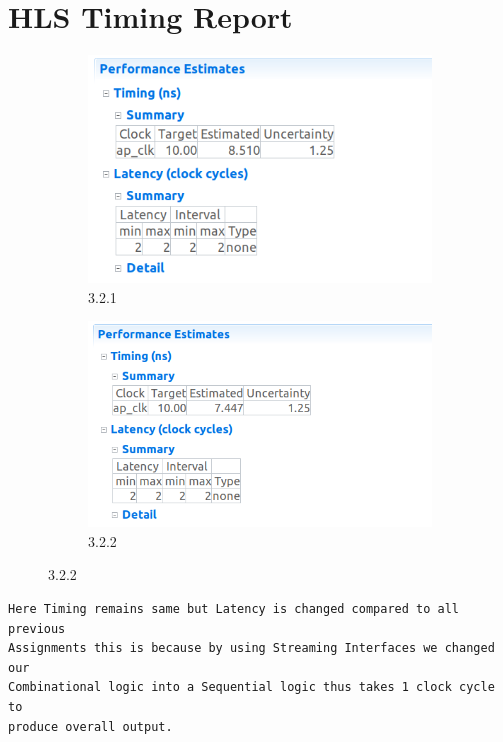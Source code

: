 \documentclass{article}
\begin{document}
\section{HLS Timing Report}
\vspace{1cm}
\begin{figure}[h]
\centering
\begin{subfigure}[b]{0.8\textwidth}
    \centering
\includegraphics[width=\textwidth]{figs/32a.png}
    \caption{3.2.1}
    \label{fig:my_label}
\end{subfigure}
\hfill
\begin{subfigure}[b]{0.8\textwidth}
    \centering
\includegraphics[width=\textwidth]{figs/32b.png}
    \caption{3.2.2}
    \label{fig:my_label}
\end{subfigure}
\end{figure}
\begin{lstlisting}
Here Timing remains same but Latency is changed compared to all previous
Assignments this is because by using Streaming Interfaces we changed our
Combinational logic into a Sequential logic thus takes 1 clock cycle to
produce overall output.
\end{lstlisting}
\vspace{5cm}
\end{document}
